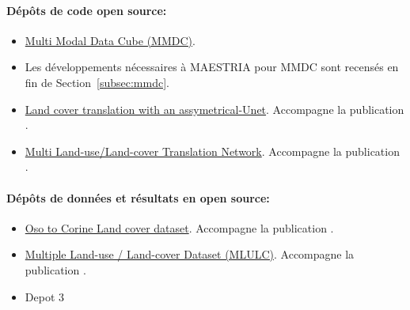 \paragraph{Dépôts de code open source:}
\begin{itemize}
    \item \href{https://src.koda.cnrs.fr/mmdc}{Multi Modal Data Cube (MMDC)}.
    \item Les développements nécessaires à MAESTRIA pour MMDC sont recensés en fin de Section~\ref{subsec:mmdc}.
    \item \href{https://github.com/LBaudoux/Unet_LandCoverTranslator}{Land cover translation with an assymetrical-Unet}. Accompagne la publication \cite{Luc_RS}.
    \item \href{https://github.com/LBaudoux/MLULC}{Multi Land-use/Land-cover Translation Network}. Accompagne la publication \cite{luc_ijgis}.
\end{itemize}

\paragraph{Dépôts de données et résultats en open source:}
\begin{itemize}
    \item \href{https://zenodo.org/records/4459484}{Oso to Corine Land cover dataset}. Accompagne la publication \cite{Luc_RS}.
    \item \href{https://zenodo.org/records/5843595}{Multiple Land-use / Land-cover Dataset (MLULC)}. Accompagne la publication \cite{luc_ijgis}.
    \item Depot 3
\end{itemize}

